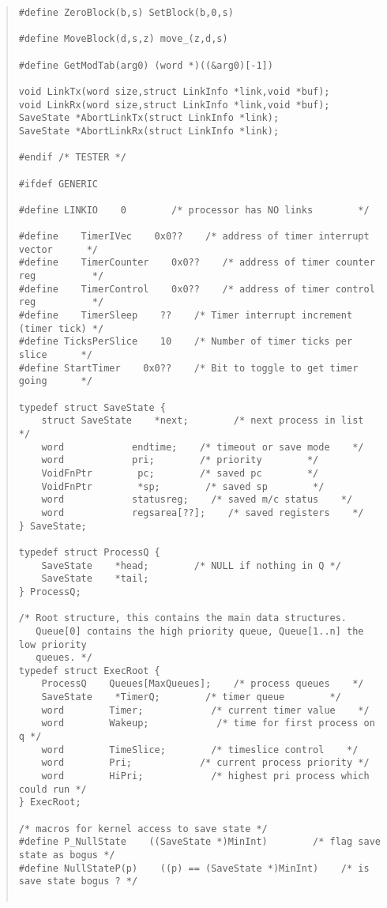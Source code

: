 \begin {quote}
\begin{verbatim}
#define ZeroBlock(b,s) SetBlock(b,0,s)

#define MoveBlock(d,s,z) move_(z,d,s)

#define GetModTab(arg0) (word *)((&arg0)[-1])

void LinkTx(word size,struct LinkInfo *link,void *buf);
void LinkRx(word size,struct LinkInfo *link,void *buf);
SaveState *AbortLinkTx(struct LinkInfo *link);
SaveState *AbortLinkRx(struct LinkInfo *link);

#endif /* TESTER */

#ifdef GENERIC

#define LINKIO    0        /* processor has NO links        */

#define    TimerIVec    0x0??    /* address of timer interrupt vector      */
#define    TimerCounter    0x0??    /* address of timer counter reg          */
#define    TimerControl    0x0??    /* address of timer control reg          */
#define    TimerSleep    ??    /* Timer interrupt increment (timer tick) */
#define TicksPerSlice    10    /* Number of timer ticks per slice      */
#define StartTimer    0x0??    /* Bit to toggle to get timer going      */

typedef struct SaveState {
    struct SaveState    *next;        /* next process in list    */
    word            endtime;    /* timeout or save mode    */
    word            pri;        /* priority        */
    VoidFnPtr        pc;        /* saved pc        */
    VoidFnPtr        *sp;        /* saved sp        */
    word            statusreg;    /* saved m/c status    */
    word            regsarea[??];    /* saved registers    */
} SaveState;

typedef struct ProcessQ {
    SaveState    *head;        /* NULL if nothing in Q */
    SaveState    *tail;
} ProcessQ;

/* Root structure, this contains the main data structures.
   Queue[0] contains the high priority queue, Queue[1..n] the low priority
   queues. */
typedef struct ExecRoot {
    ProcessQ    Queues[MaxQueues];    /* process queues    */
    SaveState    *TimerQ;        /* timer queue        */
    word        Timer;            /* current timer value    */
    word        Wakeup;            /* time for first process on q */
    word        TimeSlice;        /* timeslice control    */
    word        Pri;            /* current process priority */
    word        HiPri;            /* highest pri process which could run */
} ExecRoot;

/* macros for kernel access to save state */
#define P_NullState    ((SaveState *)MinInt)        /* flag save state as bogus */
#define NullStateP(p)    ((p) == (SaveState *)MinInt)    /* is save state bogus ? */


\end{verbatim}
\end{quote}
